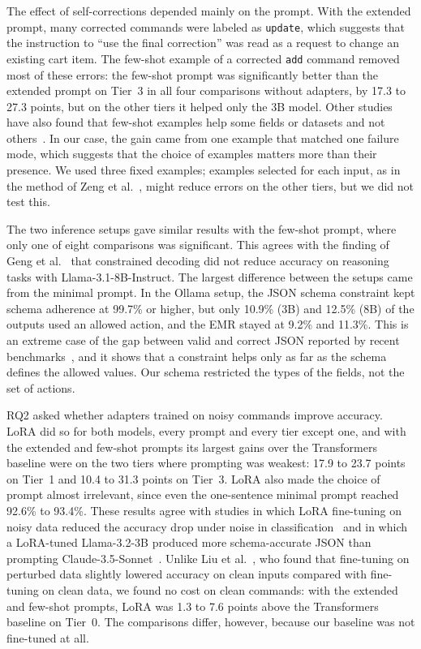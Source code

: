 \documentclass[journal,article,submit,pdftex,moreauthors]{Definitions/mdpi}
\begin{document}
The effect of self-corrections depended mainly on the prompt. With the extended prompt, many corrected commands were labeled as \texttt{update}, which suggests that the instruction to ``use the final correction'' was read as a request to change an existing cart item. The few-shot example of a corrected \texttt{add} command removed most of these errors: the few-shot prompt was significantly better than the extended prompt on Tier~3 in all four comparisons without adapters, by 17.3 to 27.3 points, but on the other tiers it helped only the 3B model. Other studies have also found that few-shot examples help some fields or datasets and not others~\citep{wang2024adaptable,corso2026clinician}. In our case, the gain came from one example that matched one failure mode, which suggests that the choice of examples matters more than their presence. We used three fixed examples; examples selected for each input, as in the method of Zeng et al.~\citep{zeng2025examples}, might reduce errors on the other tiers, but we did not test this.

The two inference setups gave similar results with the few-shot prompt, where only one of eight comparisons was significant. This agrees with the finding of Geng et al.~\citep{geng2025jsonschemabench} that constrained decoding did not reduce accuracy on reasoning tasks with Llama-3.1-8B-Instruct. The largest difference between the setups came from the minimal prompt. In the Ollama setup, the JSON schema constraint kept schema adherence at 99.7\% or higher, but only 10.9\% (3B) and 12.5\% (8B) of the outputs used an allowed action, and the EMR stayed at 9.2\% and 11.3\%. This is an extreme case of the gap between valid and correct JSON reported by recent benchmarks~\citep{singh2026structured,feng2026so,ferguson2026extractbench}, and it shows that a constraint helps only as far as the schema defines the allowed values. Our schema restricted the types of the fields, not the set of actions.

RQ2 asked whether adapters trained on noisy commands improve accuracy. LoRA did so for both models, every prompt and every tier except one, and with the extended and few-shot prompts its largest gains over the Transformers baseline were on the two tiers where prompting was weakest: 17.9 to 23.7 points on Tier~1 and 10.4 to 31.3 points on Tier~3. LoRA also made the choice of prompt almost irrelevant, since even the one-sentence minimal prompt reached 92.6\% to 93.4\%. These results agree with studies in which LoRA fine-tuning on noisy data reduced the accuracy drop under noise in classification~\citep{yang2026towards} and in which a LoRA-tuned Llama-3.2-3B produced more schema-accurate JSON than prompting Claude-3.5-Sonnet~\citep{shen2025slot}. Unlike Liu et al.~\citep{liu2026improving}, who found that fine-tuning on perturbed data slightly lowered accuracy on clean inputs compared with fine-tuning on clean data, we found no cost on clean commands: with the extended and few-shot prompts, LoRA was 1.3 to 7.6 points above the Transformers baseline on Tier~0. The comparisons differ, however, because our baseline was not fine-tuned at all.
\end{document}
